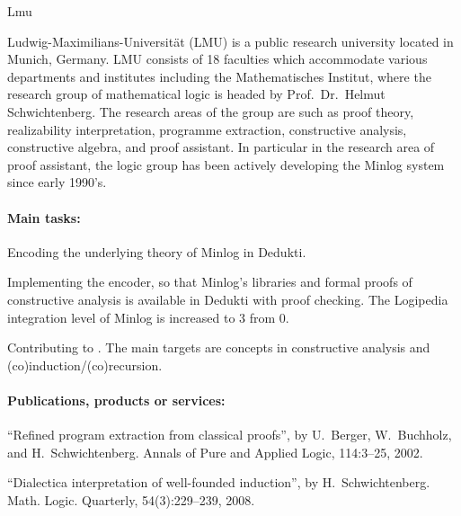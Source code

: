 \begin{sitedescription}{Lmu}

\newcommand\inquotes[1]{``#1''}


Ludwig-Maximilians-Universit\"at (LMU) is a public research university
located in Munich, Germany.  LMU consists of 18 faculties which
accommodate various departments and institutes including the
Mathematisches Institut, where the research group of mathematical
logic is headed by Prof.\ Dr.\ Helmut Schwichtenberg.  The research
areas of the group are such as proof theory, realizability
interpretation, programme extraction, constructive analysis,
constructive algebra, and proof assistant.  In particular in the
research area of proof assistant, the logic group has been actively
developing the Minlog system since early 1990's.

\paragraph*{Main tasks:}

\begin{compactitem}
  \item Encoding the underlying theory of Minlog in Dedukti.  
  \item Implementing the encoder, so that Minlog's libraries and formal proofs of constructive analysis is available in Dedukti with proof checking.
The Logipedia integration level of Minlog is increased to 3 from 0.  
  \item Contributing to .  The main targets are concepts in constructive analysis and (co)induction/(co)recursion.

\end{compactitem}

\paragraph*{Publications, products or services:}

\begin{compactitem}
\item ``Refined program extraction from classical proofs'',
  by U.~Berger, W.~Buchholz, and H.~Schwichtenberg.
  Annals of Pure and Applied Logic, 114:3--25, 2002.

\item ``Dialectica interpretation of well-founded induction'',
  by H.~Schwichtenberg.
Math. Logic. Quarterly, 54(3):229--239, 2008.


\end{compactitem}
\end{sitedescription}
